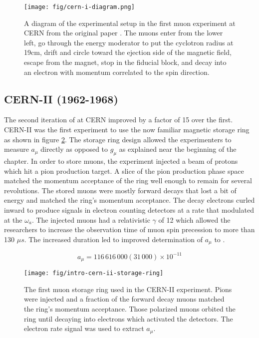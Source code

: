 \begin{figure}
\centering
\texttt{[image: fig/cern-i-diagram.png]}
\caption{A diagram of the experimental setup in the first muon \gmtwo experiment at CERN from the original paper \cite{cern-i}. The muons enter from the lower left, go through the energy moderator to put the cyclotron radius at 19cm, drift and circle toward the ejection side of the magnetic field, escape from the magnet, stop in the fiducial block, and decay into an electron with momentum correlated to the spin direction. \label{fig:cern-i-diagram}}
\end{figure}

\subsection{CERN-II (1962-1968)}
The second iteration of \mugmtwo at CERN improved by a factor of 15 over the first.  CERN-II was the first \mugmtwo experiment to use the now familiar magnetic storage ring as shown in figure \ref{fig:intro-cern-ii-storage-ring}.  The storage ring design allowed the experimenters to measure $a_\mu$ directly as opposed to $g_\mu$ as explained near the beginning of the chapter. In order to store muons, the experiment injected a beam of protons which hit a pion production target.  A slice of the pion production phase space matched the momentum acceptance of the ring well enough to remain for several revolutions. The stored muons were mostly forward decays that lost a bit of energy and matched the ring's momentum acceptance.  The decay electrons curled inward to produce signals in electron counting detectors at a rate that modulated at the $\omega_a$.  The injected muons had a relativistic $\gamma$ of 12 which allowed the researchers to increase the observation time of muon spin precession to more than 130 $\mu s$.  The increased duration led to improved determination of $a_\mu$ to  \cite{47y-muon-g-2}.

\begin{equation}
\label{eqn:cern-ii-results}
a_\mu = 116\,616\,000 (31\,000) \times 10^{-11}
\end{equation}

\begin{figure}
\centering
\texttt{[image: fig/intro-cern-ii-storage-ring]}
\caption{
    The first muon storage ring used in the CERN-II experiment.  Pions were injected and a fraction of the forward decay muons matched the ring's momentum acceptance.  Those polarized muons orbited the ring until decaying into electrons which activated the detectors.  The electron rate signal was used to extract $a_\mu$.
    \label{fig:intro-cern-ii-storage-ring}    
}
\end{figure}


